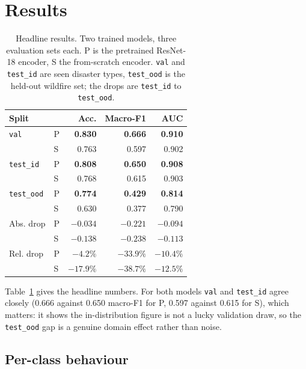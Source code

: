 \documentclass[10pt,twocolumn]{article}
\begin{document}
\section{Results}
\label{sec:results}

\begin{table}[t]
\centering
\footnotesize
\caption{Headline results. Two trained models, three evaluation sets each. P is the pretrained
ResNet-18 encoder, S the from-scratch encoder. \texttt{val} and \texttt{test\_id} are seen disaster
types, \texttt{test\_ood} is the held-out wildfire set; the drops are \texttt{test\_id} to
\texttt{test\_ood}.}
\label{tab:main}
\begin{tabular}{@{}llrrr@{}}
\toprule
\textbf{Split} & & \textbf{Acc.} & \textbf{Macro-F1} & \textbf{AUC} \\
\midrule
\texttt{val}       & P & \textbf{0.830} & \textbf{0.666} & \textbf{0.910} \\
                   & S & 0.763 & 0.597 & 0.902 \\
\texttt{test\_id}  & P & \textbf{0.808} & \textbf{0.650} & \textbf{0.908} \\
                   & S & 0.768 & 0.615 & 0.903 \\
\texttt{test\_ood} & P & \textbf{0.774} & \textbf{0.429} & \textbf{0.814} \\
                   & S & 0.630 & 0.377 & 0.790 \\
\midrule
Abs. drop          & P & $-0.034$  & $-0.221$  & $-0.094$ \\
                   & S & $-0.138$  & $-0.238$  & $-0.113$ \\
Rel. drop          & P & $-4.2\%$  & $-33.9\%$ & $-10.4\%$ \\
                   & S & $-17.9\%$ & $-38.7\%$ & $-12.5\%$ \\
\bottomrule
\end{tabular}
\end{table}

Table~\ref{tab:main} gives the headline numbers. For both models \texttt{val} and \texttt{test\_id}
agree closely (0.666 against 0.650 macro-F1 for P, 0.597 against 0.615 for S), which matters: it
shows the in-distribution figure is not a lucky validation draw, so the \texttt{test\_ood} gap is a
genuine domain effect rather than noise.

\subsection{Per-class behaviour}
\end{document}
